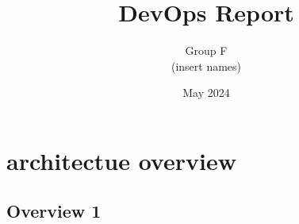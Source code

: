 \documentclass[12pt,a4paper]{report}
\title{DevOps Report}
\author{Group F \\ (insert names)}
\date{May 2024}
\begin{document}
	\maketitle
    \tableofcontents
    \listoffigures
	





    \chapter{architectue overview}
    \section{Overview 1}
    
    
    

\end{document}
